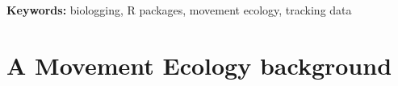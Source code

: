 \documentclass[a4paper,12pt]{article}
\begin{document}
\noindent \textbf{Keywords:} biologging, R packages, movement ecology, tracking data



\newpage


\section*{A Movement Ecology background}
%
\end{document}

